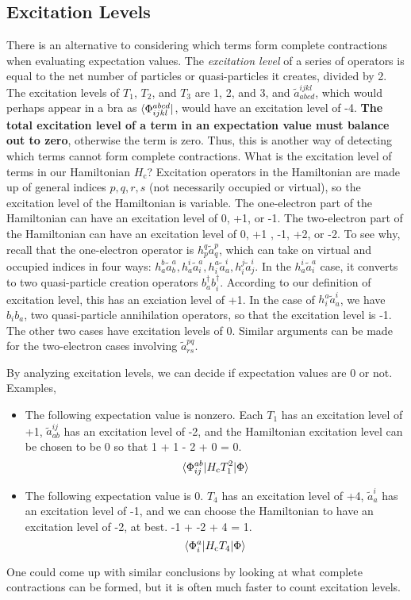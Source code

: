 \documentclass{article}
\newcommand{\Hc}{H_{\mathrm{c}}}
\begin{document}
\subsection{Excitation Levels}
There is an alternative to considering which terms form complete contractions when
evaluating expectation values. 
The \textit{excitation level} of a series of operators is equal 
to the net number of particles or quasi-particles it creates, divided by 2.
The excitation levels of $T_1$, $T_2$, and $T_3$ are 1, 2, and 3, 
and $\tilde{a}_{abcd}^{ijkl}$, which would perhaps appear in a bra as
$\bra{\Phi_{ijkl}^{abcd}}$, would have an excitation level of -4.
\textbf{The total excitation level of a term in an expectation value must balance out
to zero}, otherwise the term is zero. 
Thus, this is another way of detecting which terms cannot form complete contractions.
What is the excitation level of terms in our Hamiltonian $\Hc$?
Excitation operators in the Hamiltonian are made up of general indices $p,q,r,s$ (not necessarily occupied or virtual), so the excitation level of the Hamiltonian is variable.
The one-electron part of the Hamiltonian can have an excitation level of 0, +1, or -1. 
The two-electron part of the Hamiltonian can have an excitation level of 0, +1 , -1, +2, or -2.  
To see why, recall that the one-electron operator is $h_p^q \tilde{a}_q^p$, which
can take on virtual and occupied indices in four ways: 
$h_a^b \tilde{a}_b^a, h_a^i \tilde{a}_i^a, h_i^a \tilde{a}_a^i, h_i^j \tilde{a}_j^i$.
In the $ h_a^i \tilde{a}_i^a$ case, it converts to two quasi-particle 
creation operators $b_a^\dagger b_i^\dagger$. According to our definition of excitation
level, this has an exciation level of +1. In the case of $ h_i^a \tilde{a}_a^i $,
we have $b_i b_a $, two quasi-particle annihilation operators, so that the excitation
level is -1. 
The other two cases have excitation levels of 0.
Similar arguments can be made for the two-electron cases involving $\tilde{a}_{rs}^{pq}$.

By analyzing excitation levels, we can decide if expectation values are 0 or not.
Examples,
\begin{itemize}
\item The following expectation value is nonzero. Each $T_1$ has an excitation
level of +1, $\tilde{a}_{ab}^{ij}$ has an excitation level of -2, and the Hamiltonian
excitation level can be chosen to be 0 so that 1 + 1 - 2 + 0 = 0.
\[ \braket{\Phi_{ij}^{ab} | \Hc T_1^2 | \Phi} \] 
\item The following expectation value is 0. $T_4$ has an excitation level of +4,
$\tilde{a}_{a}^{i}$ has an excitation level of -1, and we can choose 
the Hamiltonian to have an excitation level of -2, at best. -1 + -2 + 4 = 1.
\[ \braket{\Phi_i^a | \Hc T_4 | \Phi} \] 
\end{itemize}
One could come up with similar conclusions by looking at what complete contractions
can be formed, but it is often much faster to count excitation levels.
\end{document}

